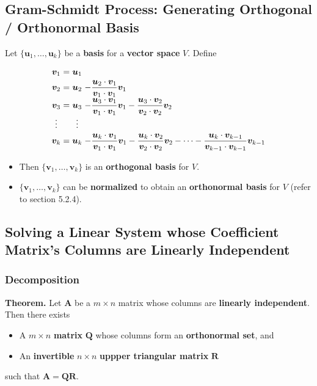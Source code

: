 \documentclass[../ma2001_notes.tex]{subfiles}
\begin{document}
\subsection{Gram-Schmidt Process: Generating Orthogonal / Orthonormal Basis}
Let \(\{\bm{u}_1,\ldots,\bm{u}_k\}\) be a \textbf{basis} for a \textbf{vector space} \(V\). Define
\[\def\arraystretch{1.5}
\arraycolsep=1.4pt
\begin{array}{*3c{>{\displaystyle}l}}
	\bm{v}_1 & = & \bm{u}_1 & \\
	\bm{v}_2 & = & \displaystyle\bm{u}_2 & -\frac{\bm{u}_2\cdot\bm{v}_1}{\bm{v}_1\cdot\bm{v}_1}\bm{v}_1 \\
	\bm{v}_3 & = & \bm{u}_3& -\displaystyle\frac{\bm{u}_3\cdot\bm{v}_1}{\bm{v}_1\cdot\bm{v}_1}\bm{v}_1-\frac{\bm{u}_3\cdot\bm{v}_2}{\bm{v}_2\cdot\bm{v}_2}\bm{v}_2 \\
	\vdots & & \vdots \\
	\bm{v}_k & = & \bm{u}_k& -\displaystyle\frac{\bm{u}_k\cdot\bm{v}_1}{\bm{v}_1\cdot\bm{v}_1}\bm{v}_1-\frac{\bm{u}_k\cdot\bm{v}_2}{\bm{v}_2\cdot\bm{v}_2}\bm{v}_2-\cdots-\frac{\bm{u}_k\cdot\bm{v}_{k-1}}{\bm{v}_{k-1}\cdot\bm{v}_{k-1}}\bm{v}_{k-1} \\
\end{array}\]
\begin{itemize}
	\item Then \(\{\bm{v}_1,\ldots,\bm{v}_k\}\) is an \textbf{orthogonal basis} for \(V\).
	\item\(\{\bm{v}_1,\ldots,\bm{v}_k\}\) can be \textbf{normalized} to obtain an \textbf{orthonormal basis} for \(V\) (refer to section 5.2.4).
\end{itemize}

\subsection{Solving a Linear System whose Coefficient Matrix's Columns are Linearly Independent}
\subsubsection{Decomposition}
\textbf{Theorem.} Let \(\bm{A}\) be a \(m\times n\) matrix whose columns are \textbf{linearly independent}. Then there exists
\begin{itemize}
	\item A \(m\times n\) \textbf{matrix} \(\bm{Q}\) whose columns form an \textbf{orthonormal set}, and
	\item An \textbf{invertible} \(n\times n\) \textbf{uppper triangular matrix} \(\bm{R}\)
\end{itemize}
such that \(\bm{A}=\bm{QR}\).
\end{document}
